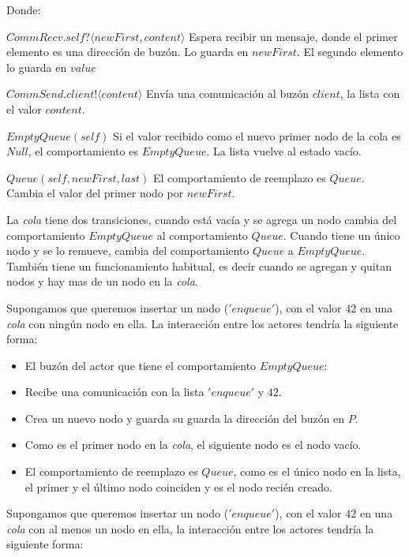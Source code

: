 Donde:

\begin{description}
 \item $CommRecv.self?\langle newFirst, content \rangle$ Espera recibir un mensaje, donde el primer elemento es una dirección de buzón. Lo guarda en $newFirst$. El segundo elemento lo guarda en $value$
 \item $CommSend.client!\langle content \rangle$ Envía una comunicación al buzón $client$, la lista con el valor $content$. 
 \item $EmptyQueue(self)$ Si el valor recibido como el nuevo primer nodo de la cola es $Null$, el comportamiento es $EmptyQueue$. La lista vuelve al estado vacío.
 \item $Queue(self, newFirst, last)$ El comportamiento de reemplazo es $Queue$. Cambia el valor del primer nodo por $newFirst$.
 \end{description}
 
La \textit{cola} tiene dos transiciones, cuando está vacía y se agrega un nodo cambia del comportamiento $EmptyQueue$ al comportamiento $Queue$. Cuando tiene un único nodo y se lo remueve, cambia del comportamiento $Queue$ a $EmptyQueue$. También tiene un funcionamiento habitual, es decir cuando se agregan y quitan nodos y hay mas de un nodo en la \textit{cola}.

Supongamos que queremos insertar un nodo ($'enqueue'$), con el valor $42$ en una \textit{cola} con ningún nodo en ella. La interacción entre los actores tendría la siguiente forma:

\begin{itemize}
 \item El buzón del actor que tiene el comportamiento $EmptyQueue$:
 \item Recibe una comunicación con la lista $'enqueue'$ y $42$.
 \item Crea un nuevo nodo y guarda su guarda la dirección del buzón en $P$.
 \item Como es el primer nodo en la \textit{cola}, el siguiente nodo es el nodo vacío.
 \item El comportamiento de reemplazo es $Queue$, como es el único nodo en la lista, el primer y el último nodo coinciden y es el nodo recién creado.
\end{itemize}

Supongamos que queremos insertar un nodo ($'enqueue'$), con el valor $42$ en una \textit{cola} con al menos un nodo en ella, la interacción entre los actores tendría la siguiente forma:

